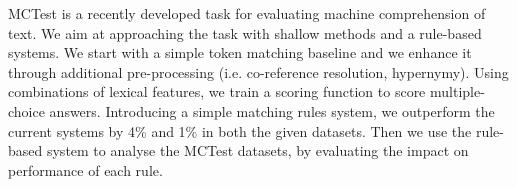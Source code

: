 MCTest is a recently developed task for evaluating machine comprehension of text. We aim at approaching the task with shallow methods and a rule-based systems.
We start with a simple token matching baseline and we enhance it through additional pre-processing (i.e. co-reference resolution, hypernymy).
Using combinations of lexical features, we train a scoring function to score multiple-choice answers.
Introducing a simple matching rules system, we outperform the current systems by 4\% and 1\% in both the given datasets. Then we use the rule-based system to analyse the MCTest datasets, by evaluating the impact on performance of each rule.